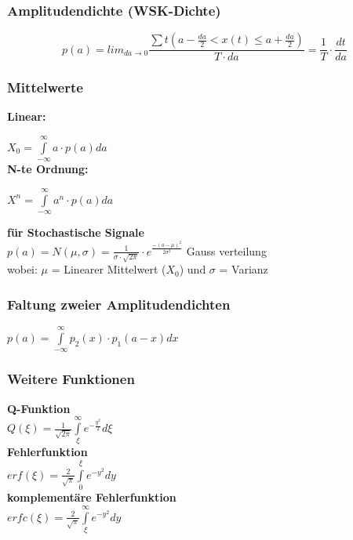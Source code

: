 \subsubsection{Amplitudendichte (WSK-Dichte)}

$$
  p(a)  = lim_{da \to 0} \frac{\sum t (a-\frac{da}{2} < x(t) \leq a + \frac{da}{2})}{T \cdot da}
  = \frac{1}{T} \cdot \frac{dt}{da}   
$$
\begin{minipage}{0.49 \textwidth}
  \subsubsection*{Mittelwerte} 
  \textbf{Linear:}
  
  \noindent $X_0 = \int \limits _{-\infty} ^{\infty} a \cdot p(a) da$
  \\
  \textbf{N-te Ordnung:}
  
  \noindent $X^n = \int \limits _{-\infty} ^{\infty} a^n \cdot p(a) da$
  
  \noindent \textbf{für Stochastische Signale}
  \\
  \noindent $p(a) = N(\mu, \sigma) = \frac{1}{\sigma \cdot \sqrt{2\pi}}\cdot e^{\frac{-(a-\mu)^2}{2\sigma^2}} $
  {\tiny Gauss verteilung} 
  \\
  wobei: $\mu$ = Linearer Mittelwert ($X_0$)
  \newline und $\sigma$ = Varianz
  
  \subsubsection*{Faltung zweier Amplitudendichten}
  
  $p(a) = \int \limits _{-\infty} ^{\infty} p_2(x) \cdot p_1(a-x)dx$
\end{minipage}%
\begin{minipage}{0.49 \textwidth}
  
  
  \subsubsection*{Weitere Funktionen}
  
  \textbf{Q-Funktion}\\
  $Q(\xi) = \frac{1}{\sqrt{2\pi}}\int \limits _{\xi} ^{\infty} e^{-\frac{y^2}{2}}d\xi$
  \\ \textbf{Fehlerfunktion} \\
  $erf(\xi) = \frac{2}{\sqrt{\pi}} \int \limits _{0} ^{\xi} e^{-y^2} dy$
  \\ \textbf{komplementäre Fehlerfunktion} \\
  $erfc(\xi) =  \frac{2}{\sqrt{\pi}} \int \limits _{\xi} ^{\infty} e^{-y^2} dy $
\end{minipage}
  